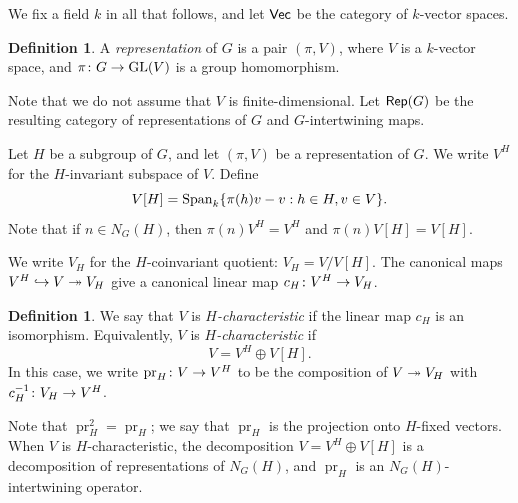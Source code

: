 \documentclass[letter]{amsart}
\newtheorem{lemma}[thm]{Lemma}
\theoremstyle{definition}
\newtheorem{definition}[thm]{Definition}
\theoremstyle{remark}
\numberwithin{thm}{section}
\numberwithin{equation}{section}
\DeclareMathOperator{\pr}{pr}
\DeclareMathOperator{\GL}{GL}
\begin{document}
We fix a field $k$ in all that follows, and let ${\mathsf{Vec}}$ be the category of $k$-vector spaces.  
\begin{definition}
A {\em representation} of $G$ is a pair $(\pi, V)$, where $V$ is a $k$-vector space, and $\pi \From G \To \GL(V)$ is a group homomorphism.
\end{definition}

Note that we do not assume that $V$ is finite-dimensional.  Let ${\mathsf{Rep}}(G)$ be the resulting category of representations of $G$ and $G$-intertwining maps.  %

Let $H$ be a subgroup of $G$, and let $(\pi, V)$ be a representation of $G$.  We write $V^H$ for the $H$-invariant subspace of $V$.  Define
$$V[H] =   \operatorname{Span}_k \{ \pi(h) v - v : h \in H, v \in V \}.$$
Note that if $n \in N_G(H)$, then $\pi(n) V^H = V^H$ and $\pi(n) V[H] = V[H]$.  

We write $V_H$ for the $H$-coinvariant quotient:  $V_H = V / V[H]$.  The canonical maps $V^H \hookrightarrow V \twoheadrightarrow V_H$ give a canonical linear map $c_H \colon V^H \rightarrow V_H$.  
\begin{definition}
We say that $V$ is {\em $H$-characteristic} if the linear map $c_H$ is an isomorphism.  Equivalently, $V$ is {\em $H$-characteristic} if 
$$V = V^H \oplus V[H].$$
In this case, we write $\pr_H \From V \To V^H$ to be the composition of $V \twoheadrightarrow V_H$ with $c_H^{-1} \colon V_H \rightarrow V^H$.  
\end{definition}
Note that $\pr_H^2 = \pr_H$; we say that $\pr_H$ is the projection onto $H$-fixed vectors.  When $V$ is $H$-characteristic, the decomposition $V = V^H \oplus V[H]$ is a decomposition of representations of $N_G(H)$, and $\pr_H$ is an $N_G(H)$-intertwining operator.
\end{document}
